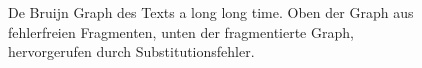 \begin{figure}[h]
\begin{center}
{{				\label{fig:debruijn-correct}
			}
		}
	\end{center}
	\caption{De Bruijn Graph des Texts \glqq a long long time\grqq . Oben der Graph aus fehlerfreien Fragmenten, unten der fragmentierte Graph, hervorgerufen durch Substitutionsfehler.}
	\label{fig:debruijn-graph}
\end{figure}


